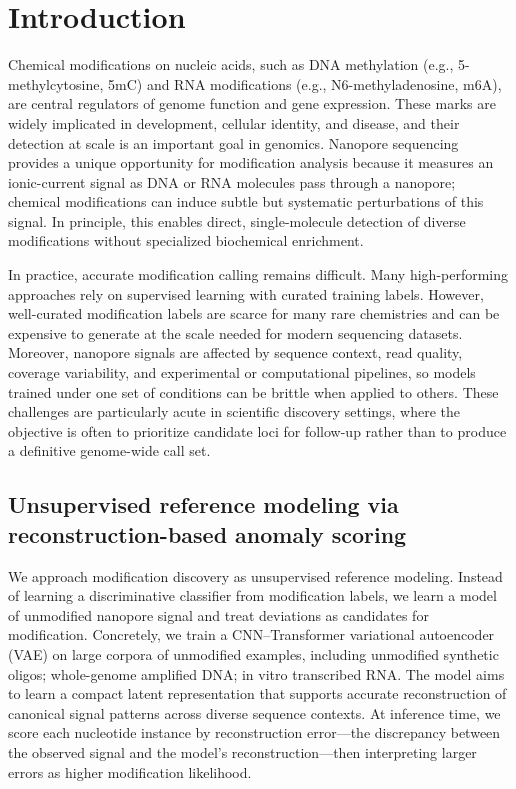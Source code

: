 \documentclass[journal,article,submit,pdftex,moreauthors]{Definitions/mdpi}
\begin{document}
\section{Introduction}
Chemical modifications on nucleic acids, such as DNA methylation (e.g., 5-methylcytosine, 5mC) and RNA modifications (e.g., N6-methyladenosine, m6A), are central regulators of genome function and gene expression\cite{ref1}. These marks are widely implicated in development, cellular identity, and disease, and their detection at scale is an important goal in genomics. Nanopore sequencing provides a unique opportunity for modification analysis because it measures an ionic-current signal as DNA or RNA molecules pass through a nanopore; chemical modifications can induce subtle but systematic perturbations of this signal. In principle, this enables direct, single-molecule detection of diverse modifications without specialized biochemical enrichment.

In practice, accurate modification calling remains difficult. Many high-performing approaches rely on supervised learning with curated training labels. However, well-curated modification labels are scarce for many rare chemistries and can be expensive to generate at the scale needed for modern sequencing datasets. Moreover, nanopore signals are affected by sequence context, read quality, coverage variability, and experimental or computational pipelines, so models trained under one set of conditions can be brittle when applied to others. These challenges are particularly acute in scientific discovery settings, where the objective is often to prioritize candidate loci for follow-up rather than to produce a definitive genome-wide call set.

\subsection{Unsupervised reference modeling via reconstruction-based anomaly scoring}
We approach modification discovery as unsupervised reference modeling. Instead of learning a discriminative classifier from modification labels, we learn a model of unmodified nanopore signal and treat deviations as candidates for modification. Concretely, we train a CNN--Transformer variational autoencoder (VAE) on large corpora of unmodified examples, including unmodified synthetic oligos; whole-genome amplified DNA; in vitro transcribed RNA. The model aims to learn a compact latent representation that supports accurate reconstruction of canonical signal patterns across diverse sequence contexts. At inference time, we score each nucleotide instance by reconstruction error---the discrepancy between the observed signal and the model’s reconstruction---then interpreting larger errors as higher modification likelihood.
\end{document}

